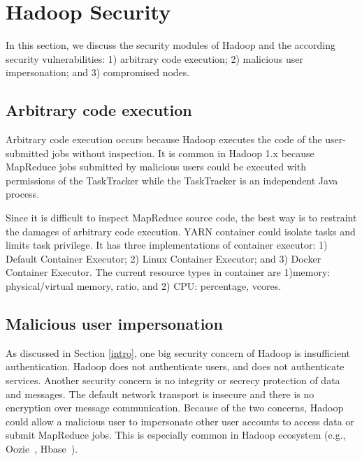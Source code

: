 \section{Hadoop Security}
\label{security}
In this section, we discuss the security modules of Hadoop and the according security vulnerabilities: 1) arbitrary code execution; 2) malicious user impersonation; and 3) compromised nodes.
\subsection{Arbitrary code execution}
Arbitrary code execution occurs because Hadoop executes the code of the user-submitted jobs without inspection. It is common in Hadoop 1.x because MapReduce jobs submitted by malicious users could be executed with permissions of the TaskTracker while the TaskTracker is an independent Java process.

Since it is difficult to inspect MapReduce source code, the best way is to restraint the damages of arbitrary code execution. YARN container could isolate tasks and limits task privilege. It has three implementations of container executor: 1) Default Container Executor; 2) Linux Container Executor; and 3) Docker Container Executor. The current resource types in container are 1)memory: physical/virtual memory, ratio, and 2) CPU: percentage, vcores.

\subsection{Malicious user impersonation}
As discussed in Section \ref{intro}, one big security concern of Hadoop is insufficient authentication. Hadoop does not authenticate users, and does not authenticate services. Another security concern is no integrity or secrecy protection of data and messages. The default network transport is insecure and there is no encryption over message communication. Because of the two concerns, Hadoop could allow a malicious user to impersonate other user accounts to access data or submit MapReduce jobs. This is especially common in Hadoop ecosystem (e.g., Oozie~\cite{oozie}, Hbase~\cite{hbase}).

